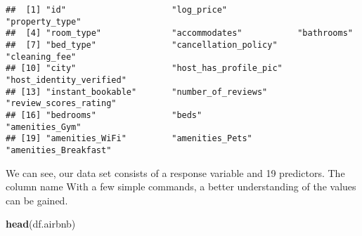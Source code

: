 \documentclass[
]{article}
\newenvironment{Shaded}{\begin{snugshade}}{\end{snugshade}}
\newcommand{\KeywordTok}[1]{\textcolor[rgb]{0.13,0.29,0.53}{\textbf{#1}}}
\newcommand{\NormalTok}[1]{#1}
\begin{document}
\begin{verbatim}
##  [1] "id"                     "log_price"              "property_type"         
##  [4] "room_type"              "accommodates"           "bathrooms"             
##  [7] "bed_type"               "cancellation_policy"    "cleaning_fee"          
## [10] "city"                   "host_has_profile_pic"   "host_identity_verified"
## [13] "instant_bookable"       "number_of_reviews"      "review_scores_rating"  
## [16] "bedrooms"               "beds"                   "amenities_Gym"         
## [19] "amenities_WiFi"         "amenities_Pets"         "amenities_Breakfast"
\end{verbatim}

We can see, our data set consists of a response variable and 19
predictors. The column name With a few simple commands, a better
understanding of the values can be gained.

\begin{Shaded}
\begin{Highlighting}[]
\KeywordTok{head}\NormalTok{(df.airbnb)}
\end{Highlighting}
\end{Shaded}
\end{document}
